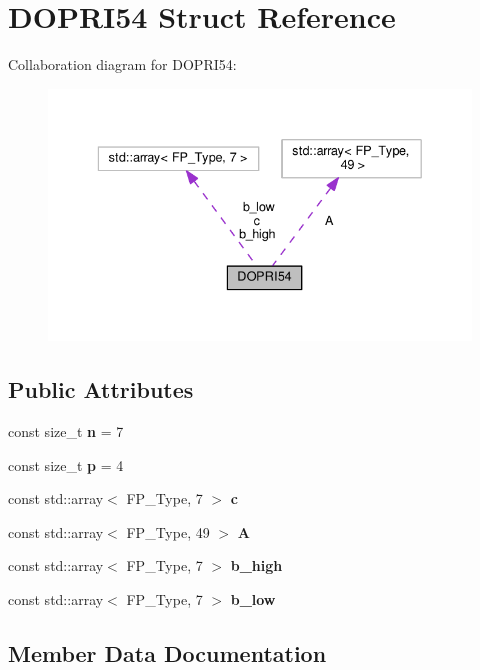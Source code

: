 \hypertarget{structDOPRI54}{}\section{D\+O\+P\+R\+I54 Struct Reference}
\label{structDOPRI54}


Collaboration diagram for D\+O\+P\+R\+I54\+:
\nopagebreak
\begin{figure}[H]
\begin{center}
\leavevmode
\includegraphics[width=336pt]{structDOPRI54__coll__graph}
\end{center}
\end{figure}
\subsection*{Public Attributes}
\begin{DoxyCompactItemize}
\item 
\mbox{\label{structDOPRI54_a5696f5102cc30b9d75e2ed881bbd6e97}} 
const size\+\_\+t {\bfseries n} = 7
\item 
\mbox{\label{structDOPRI54_a2ba7362999ab075d019a132607acba04}} 
const size\+\_\+t {\bfseries p} = 4
\item 
const std\+::array$<$ F\+P\+\_\+\+Type, 7 $>$ {\bfseries c}
\item 
const std\+::array$<$ F\+P\+\_\+\+Type, 49 $>$ {\bfseries A}
\item 
const std\+::array$<$ F\+P\+\_\+\+Type, 7 $>$ {\bfseries b\+\_\+high}
\item 
const std\+::array$<$ F\+P\+\_\+\+Type, 7 $>$ {\bfseries b\+\_\+low}
\end{DoxyCompactItemize}


\subsection{Member Data Documentation}
\mbox{\label{structDOPRI54_a12a69b426524b011c7cb1c5be7aba756}} 
